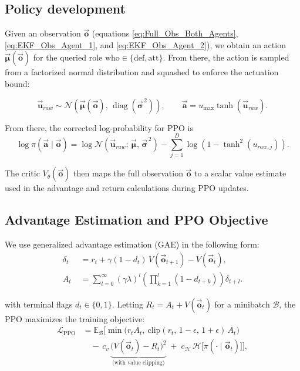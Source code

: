 \subsection{Policy development}
\label{subsec:policy-development}


Given an observation \(\vec{\mathbf{o}}\) (equations \ref{eq:Full_Obs_Both_Agents}, \ref{eq:EKF_Obs_Agent_1}, and \ref{eq:EKF_Obs_Agent_2}), we obtain an action $\vec{\boldsymbol{\mu}}(\vec{\mathbf{o}})$ for the queried role \(\mathrm{who}\in\{\mathrm{def},\mathrm{att}\}\). From there, the action is sampled from a factorized normal distribution and squashed to enforce the actuation bound:

\[
\vec{\mathbf{u}}_{raw} \sim \mathcal{N}\!\left(\vec{\boldsymbol{\mu}}(\vec{\mathbf{o}}),\, \operatorname{diag}\!\left(\vec{\boldsymbol{\sigma}}^{\,2}\right)\right),
\qquad
\vec{\mathbf{a}} = u_{\max}\tanh\!\left(\vec{\mathbf{u}}_{raw}\right).
\]

From there, the corrected log-probability for PPO is
\[
\log \pi(\vec{\mathbf{a}} \mid \vec{\mathbf{o}})
=
\log \mathcal{N}\!\left(\vec{\mathbf{u}}_{raw};\, \vec{\boldsymbol{\mu}},\, \vec{\boldsymbol{\sigma}}^{\,2}\right)
-
\sum_{j=1}^{D}\log\!\left(1-\tanh^2(u_{raw,j})\right).
\]


The critic \(V_\theta(\vec{\mathbf{o}})\) then maps the full observation \(\vec{\mathbf{o}}\) to a scalar value estimate used in the advantage and return calculations during PPO updates.



\subsection{Advantage Estimation and PPO Objective}
\label{subsec:advantage-estimation-ppo}
We use generalized advantage estimation (GAE) in the following form:
\[
\begin{aligned}
\delta_t \;&= r_t + \gamma(1-d_t)\,V(\vec{\mathbf{o}}_{t+1}) - V(\vec{\mathbf{o}}_{t}),\\[4pt]
A_t \;&= \sum_{l=0}^{\infty} (\gamma\lambda)^l
\left(\prod_{k=1}^{l} (1-d_{t+k})\right)\delta_{t+l}.
\end{aligned}
\]

with terminal flags \(d_t\in\{0,1\}\). Letting  \(R_t=A_t+V(\vec{\mathbf{o}}_t)\) for a minibatch \(\mathcal{B}\), the PPO maximizes the training objective:
\begin{align*}
\mathcal{L}_{\text{PPO}}
&= \mathbb{E}_{\mathcal{B}}\Big[
\min\!\big(r_t A_t,\ \mathrm{clip}(r_t,\,1{-}\epsilon,\,1{+}\epsilon)\,A_t\big)
\\
&\quad -\, c_v\,\underbrace{\big(V(\vec{\mathbf{o}}_t) - R_t\big)^2}_{\text{(with value clipping)}}
\;+\; c_{\mathcal{H}}\,\mathcal{H}\!\big[\pi(\cdot\!\mid \vec{\mathbf{o}}_t)\big]
\Big],
\end{align*}

